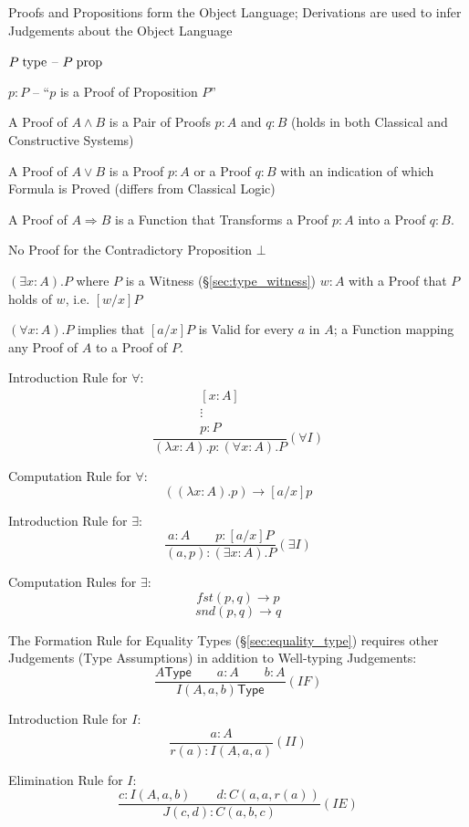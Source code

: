Proofs and Propositions form the Object Language; Derivations are used
to infer Judgements about the Object Language


\asterism


$P\;\mathrm{type}$ -- $P\;\mathrm{prop}$

$p : P$ -- ``$p$ is a Proof of Proposition $P$''

A Proof of $A \wedge B$ is a Pair of Proofs $p : A$ and $q : B$ (holds
in both Classical and Constructive Systems)

A Proof of $A \vee B$ is a Proof $p : A$ or a Proof $q : B$ with an
indication of which Formula is Proved (differs from Classical Logic)

A Proof of $A \Rightarrow B$ is a Function that Transforms a Proof $p
: A$ into a Proof $q : B$.

No Proof for the Contradictory Proposition $\bot$

$(\exists x : A).P$ where $P$ is a Witness (\S\ref{sec:type_witness})
$w : A$ with a Proof that $P$ holds of $w$, i.e. $[w/x]P$

$(\forall x : A).P$ implies that $[a/x]P$ is Valid for every $a$ in
$A$; a Function mapping any Proof of $A$ to a Proof of $P$.

Introduction Rule for $\forall$:
\[
  {
    \frac{
      \begin{matrix}
        [x : A]\\
        \vdots\\
        p : P
      \end{matrix}
    }{
      (\lambda x : A).p : (\forall x : A).P
    }
  } (\forall I)
\]

Computation Rule for $\forall$:
\[
  ((\lambda x : A).p) \rightarrow [a/x]p
\]

Introduction Rule for $\exists$:
\[
  {
    \frac{
      a : A \quad\quad p : [a/x]P
    }{
      (a,p) : (\exists x : A).P
    }
  } (\exists I)
\]

Computation Rules for $\exists$:
\[
  fst (p,q) \rightarrow p
\]\[
  snd (p,q) \rightarrow q
\]

The Formation Rule for Equality Types (\S\ref{sec:equality_type})
requires other Judgements (Type Assumptions) in addition to
Well-typing Judgements:
\[
  {
    \frac{ A \mathsf{ Type} \quad\quad a : A \quad\quad b:A }
    { I (A,a,b) \mathsf{ Type}}
  } (I F)
\]

Introduction Rule for $I$:
\[
  {
    \frac{ a : A }
    { r(a) : I(A,a,a)}
  } (II)
\]

Elimination Rule for $I$:
\[
  {
    \frac{ c : I (A, a, b) \quad\quad d : C(a,a,r(a)) }
    { J(c,d) : C(a,b,c) }
  } (I E)
\]


